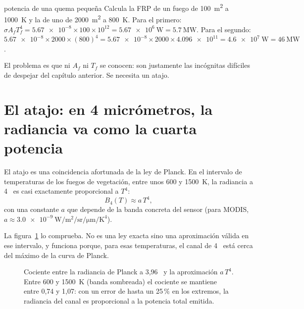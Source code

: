 \begin{ejemplo}{potencia de una quema pequeña}
Calcula la FRP de un fuego de \SI{100}{\metre\squared} a 1000~K y la de uno de
\SI{2000}{\metre\squared} a 800~K.
\solucion Para el primero: $\sigma A_f T_f^4 = \num{5.67e-8}\times 100\times 10^{12} =
\SI{5.67e6}{\watt} = \SI{5.7}{\mega\watt}$. Para el segundo: $\num{5.67e-8}\times 2000\times
(800)^4 = \num{5.67e-8}\times2000\times\num{4.096e11} = \SI{4.6e7}{\watt} =
\SI{46}{\mega\watt}$.
\end{ejemplo}

El problema es que ni $A_f$ ni $T_f$ se conocen: son justamente las incógnitas difíciles de
despejar del capítulo anterior. Se necesita un atajo.

\section{El atajo: en 4 micrómetros, la radiancia va como la cuarta potencia}

El atajo es una coincidencia afortunada de la ley de Planck. En el intervalo de temperaturas de
los fuegos de vegetación, entre unos 600 y 1500~K, la radiancia a 4~\um{} es casi exactamente
proporcional a $T^4$:
\begin{equation}\label{eq:aprox-mir}
  B_4(T) \approx a\,T^4 ,
\end{equation}
con una constante $a$ que depende de la banda concreta del sensor (para MODIS, $a \approx
\SI{3.0e-9}{\watt\per\square\metre\per\steradian\per\micro\metre\per\kelvin\tothe{4}}$).

La figura~\ref{fig:mir} lo comprueba. No es una ley exacta sino una aproximación válida en ese
intervalo, y funciona porque, para esas temperaturas, el canal de 4~\um{} está cerca del máximo
de la curva de Planck.

\begin{figure}[ht]
\centering
{}
\caption{Cociente entre la radiancia de Planck a 3,96~\um{} y la aproximación $a\,T^4$. Entre
600 y 1500~K (banda sombreada) el cociente se mantiene entre 0,74 y 1,07: con un error de
hasta un 25\,{}\% en los extremos, la radiancia del canal es proporcional a la potencia total
emitida.}
\label{fig:mir}
\end{figure}

